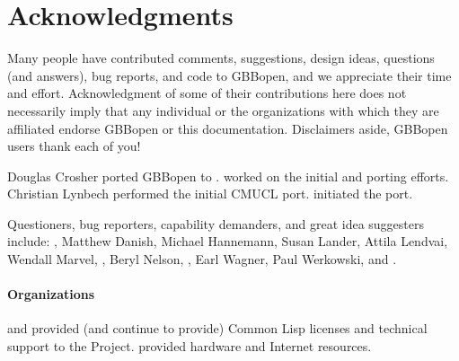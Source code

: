 


\section*{Acknowledgments}
\T{}%
\label{sec:acknowledgments}%
%

Many people have contributed comments, suggestions, design ideas, questions
(and answers), bug reports, and code to GBBopen, and we appreciate their time
and effort.  Acknowledgment of some of their contributions here does not
necessarily imply that any individual or the organizations with which they are
affiliated endorse GBBopen or this documentation.  Disclaimers aside, GBBopen
users thank each of you!

Douglas Crosher ported GBBopen to .   worked on the initial  and
 porting efforts.
Christian Lynbech performed the initial CMUCL port.   initiated the
 port.

Questioners, bug reporters, capability demanders, and great idea suggesters
include: , Matthew Danish,
Michael Hannemann, Susan Lander, Attila Lendvai, Wendall Marvel,
, Beryl Nelson,
, Earl Wagner, Paul
Werkowski, and .

\paragraph{Organizations}

 and  provided (and continue to provide)
Common Lisp licenses and technical support to the Project.
 provided hardware
and Internet resources.  

